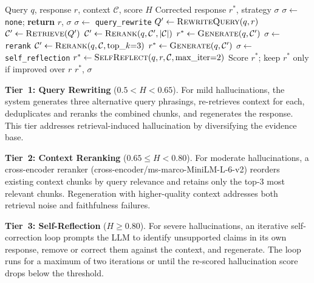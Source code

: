 \documentclass[conference]{IEEEtran}
\begin{document}
\begin{algorithm}[t]
\caption{Confidence-Gated Mitigation Router}
\label{alg:router}
\begin{algorithmic}[1]
\REQUIRE Query $q$, response $r$, context $\mathcal{C}$, score $H$
\ENSURE Corrected response $r^*$, strategy $\sigma$
    \STATE $\sigma \leftarrow$ \texttt{none}; \textbf{return} $r$, $\sigma$
    \STATE $\sigma \leftarrow$ \texttt{query\_rewrite}
    \STATE $Q' \leftarrow \textsc{RewriteQuery}(q, r)$ 
    \STATE $\mathcal{C}' \leftarrow \textsc{Retrieve}(Q')$ 
    \STATE $\mathcal{C}' \leftarrow \textsc{Rerank}(q, \mathcal{C}', |\mathcal{C}|)$
    \STATE $r^* \leftarrow \textsc{Generate}(q, \mathcal{C}')$
    \STATE $\sigma \leftarrow$ \texttt{rerank}
    \STATE $\mathcal{C}' \leftarrow \textsc{Rerank}(q, \mathcal{C}, \text{top\_}k{=}3)$
    \STATE $r^* \leftarrow \textsc{Generate}(q, \mathcal{C}')$
\ELSE {}
    \STATE $\sigma \leftarrow$ \texttt{self\_reflection}
    \STATE $r^* \leftarrow \textsc{SelfReflect}(q, r, \mathcal{C}, \text{max\_iter}{=}2)$
\ENDIF
\STATE Score $r^*$; keep $r^*$ only if improved over $r$
\RETURN $r^*$, $\sigma$
\end{algorithmic}
\end{algorithm}

\textbf{Tier~1: Query Rewriting} ($0.5 < H < 0.65$). For mild hallucinations, the system generates three alternative query phrasings, re-retrieves context for each, deduplicates and reranks the combined chunks, and regenerates the response. This tier addresses retrieval-induced hallucination by diversifying the evidence base.

\textbf{Tier~2: Context Reranking} ($0.65 \leq H < 0.80$). For moderate hallucinations, a cross-encoder reranker (cross-encoder/ms-marco-MiniLM-L-6-v2) reorders existing context chunks by query relevance and retains only the top-3 most relevant chunks. Regeneration with higher-quality context addresses both retrieval noise and faithfulness failures.

\textbf{Tier~3: Self-Reflection} ($H \geq 0.80$). For severe hallucinations, an iterative self-correction loop prompts the LLM to identify unsupported claims in its own response, remove or correct them against the context, and regenerate. The loop runs for a maximum of two iterations or until the re-scored hallucination score drops below the threshold.
\end{document}

